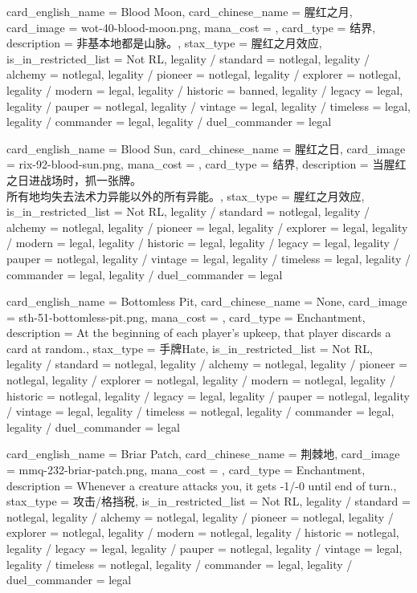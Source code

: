 \documentclass[lang = cn, color = black, 10pt]{AllThatStax}
\begin{document}
\card
{
	card_english_name = {Blood Moon},
	card_chinese_name = {腥红之月},
	card_image = wot-40-blood-moon.png,
	mana_cost = ,
	card_type = 结界,
	description = {非基本地都是山脉。},
	stax_type = 腥红之月效应,
	is_in_restricted_list = Not RL,
	legality / standard = notlegal,
	legality / alchemy = notlegal,
	legality / pioneer = notlegal,
	legality / explorer = notlegal,
	legality / modern = legal,
	legality / historic = banned,
	legality / legacy = legal,
	legality / pauper = notlegal,
	legality / vintage = legal,
	legality / timeless = legal,
	legality / commander = legal,
	legality / duel_commander = legal
}

\card
{
	card_english_name = {Blood Sun},
	card_chinese_name = {腥红之日},
	card_image = rix-92-blood-sun.png,
	mana_cost = ,
	card_type = 结界,
	description = {当腥红之日进战场时，抓一张牌。\\
		所有地均失去法术力异能以外的所有异能。},
	stax_type = 腥红之月效应,
	is_in_restricted_list = Not RL,
	legality / standard = notlegal,
	legality / alchemy = notlegal,
	legality / pioneer = legal,
	legality / explorer = legal,
	legality / modern = legal,
	legality / historic = legal,
	legality / legacy = legal,
	legality / pauper = notlegal,
	legality / vintage = legal,
	legality / timeless = legal,
	legality / commander = legal,
	legality / duel_commander = legal
}

\card
{
	card_english_name = {Bottomless Pit},
	card_chinese_name = {None},
	card_image = sth-51-bottomless-pit.png,
	mana_cost = ,
	card_type = Enchantment,
	description = {At the beginning of each player's upkeep, that player discards a card at random.},
	stax_type = 手牌Hate,
	is_in_restricted_list = Not RL,
	legality / standard = notlegal,
	legality / alchemy = notlegal,
	legality / pioneer = notlegal,
	legality / explorer = notlegal,
	legality / modern = notlegal,
	legality / historic = notlegal,
	legality / legacy = legal,
	legality / pauper = notlegal,
	legality / vintage = legal,
	legality / timeless = notlegal,
	legality / commander = legal,
	legality / duel_commander = legal
}

\card
{
	card_english_name = {Briar Patch},
	card_chinese_name = {荆棘地},
	card_image = mmq-232-briar-patch.png,
	mana_cost = ,
	card_type = Enchantment,
	description = {Whenever a creature attacks you, it gets -1/-0 until end of turn.},
	stax_type = 攻击/格挡税,
	is_in_restricted_list = Not RL,
	legality / standard = notlegal,
	legality / alchemy = notlegal,
	legality / pioneer = notlegal,
	legality / explorer = notlegal,
	legality / modern = notlegal,
	legality / historic = notlegal,
	legality / legacy = legal,
	legality / pauper = notlegal,
	legality / vintage = legal,
	legality / timeless = notlegal,
	legality / commander = legal,
	legality / duel_commander = legal
}
\end{document}
